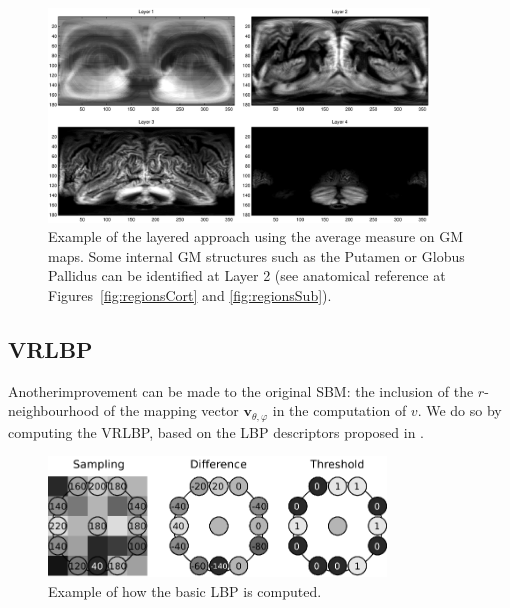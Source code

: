 \begin{figure}[htp]
	\myfloatalign
	\includegraphics[width=0.9\textwidth]{Graphics/ch6/layeredAverageGM}
	\caption[Example of the layered approach using the average measure on \acs{GM} maps.]{Example of the layered approach using the average measure on \ac{GM} maps. Some internal \ac{GM} structures such as the Putamen or Globus Pallidus can be identified at Layer 2 (see anatomical reference at Figures~\ref{fig:regionsCort} and \ref{fig:regionsSub}).}
	\label{fig:layeredGM}
\end{figure}

\subsection{\acf{VRLBP}}\label{sec:vrlbp}
Anotherimprovement can be made to the original \ac{SBM}: the inclusion of the $r$-neighbourhood of the mapping vector $\mathbf{v}_{\theta,\varphi}$ in the computation of $v$. We do so by computing the \acf{VRLBP}, based on the \ac{LBP} descriptors proposed in \cite{Ojala1996}. 

\begin{figure}[htp]
	\myfloatalign
	\includegraphics[width=0.8\textwidth]{Graphics/ch6/lbpLinear}
	\caption{Example of how the basic \acs{LBP} is computed.}
	\label{fig:lbpBasic}
\end{figure}

